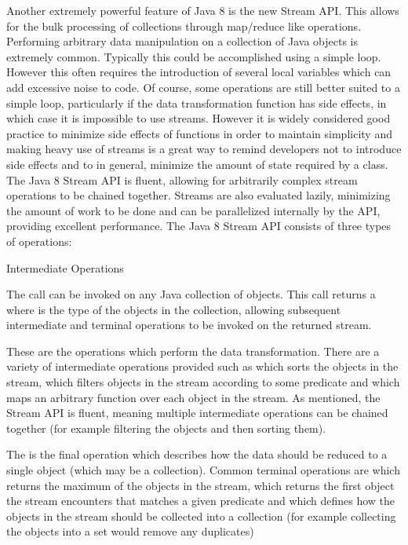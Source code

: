 


Another extremely powerful feature of Java 8 is the new Stream API. This allows for the bulk processing of collections through map/reduce like operations. Performing arbitrary data manipulation on a collection of Java objects is extremely common. Typically this could be accomplished using a simple loop. However this often requires the introduction of several local variables which can add excessive noise to code. Of course, some operations are still better suited to a simple loop, particularly if the data transformation function has side effects, in which case it is impossible to use streams. However it is widely considered good practice to minimize side effects of functions in order to maintain simplicity and making heavy use of streams is a great way to remind developers not to introduce side effects and to in general, minimize the amount of state required by a class. The Java 8 Stream API is fluent, allowing for arbitrarily complex stream operations to be chained together. Streams are also evaluated lazily, minimizing the amount of work to be done and can be parallelized internally by the API, providing excellent performance. The Java 8 Stream API consists of three types of operations: 

\begin{labeling}{Intermediate Operations}
	\item [Initial stream call] The  call can be invoked on any Java collection of objects. This call returns a  where  is the type of the objects in the collection, allowing subsequent intermediate and terminal operations to be invoked on the returned stream.
	\item [Intermediate Operations] These are the operations which perform the data transformation. There are a variety of intermediate operations provided such as  which sorts the objects in the stream,  which filters objects in the stream according to some predicate and  which maps an arbitrary function over each object in the stream. As mentioned, the Stream API is fluent, meaning multiple intermediate operations can be chained together (for example filtering the objects and then sorting them).
	\item [Terminal Operations] The is the final operation which describes how the data should be reduced to a single object (which may be a collection). Common terminal operations are  which returns the maximum of the objects in the stream,  which returns the first object the stream encounters that matches a given predicate and  which defines how the objects in the stream should be collected into a collection (for example collecting the objects into a set would remove any duplicates)
\end{labeling}


